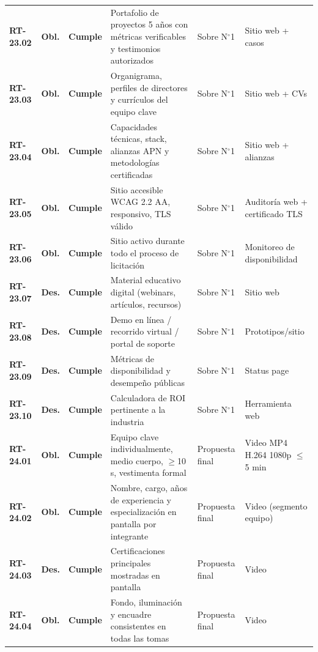 \begin{small}
\begin{longtable}{@{}p{1.35cm} p{1.15cm} p{1.15cm} p{4.6cm} p{2.35cm} p{3.8cm}@{}}
\textbf{RT-23.02} & \textbf{Obl.} & \textbf{Cumple} & Portafolio de proyectos 5 a\~nos con m\'etricas verificables y testimonios autorizados & Sobre N$^{\circ}$1 & Sitio web + casos \\
\textbf{RT-23.03} & \textbf{Obl.} & \textbf{Cumple} & Organigrama, perfiles de directores y curr\'iculos del equipo clave & Sobre N$^{\circ}$1 & Sitio web + CVs \\
\textbf{RT-23.04} & \textbf{Obl.} & \textbf{Cumple} & Capacidades t\'ecnicas, stack, alianzas APN y metodolog\'ias certificadas & Sobre N$^{\circ}$1 & Sitio web + alianzas \\
\textbf{RT-23.05} & \textbf{Obl.} & \textbf{Cumple} & Sitio accesible WCAG 2.2 AA, responsivo, TLS v\'alido & Sobre N$^{\circ}$1 & Auditor\'ia web + certificado TLS \\
\textbf{RT-23.06} & \textbf{Obl.} & \textbf{Cumple} & Sitio activo durante todo el proceso de licitaci\'on & Sobre N$^{\circ}$1 & Monitoreo de disponibilidad \\
\textbf{RT-23.07} & \textbf{Des.} & \textbf{Cumple} & Material educativo digital (webinars, art\'iculos, recursos) & Sobre N$^{\circ}$1 & Sitio web \\
\textbf{RT-23.08} & \textbf{Des.} & \textbf{Cumple} & Demo en l\'inea / recorrido virtual / portal de soporte & Sobre N$^{\circ}$1 & Prototipos/sitio \\
\textbf{RT-23.09} & \textbf{Des.} & \textbf{Cumple} & M\'etricas de disponibilidad y desempe\~no p\'ublicas & Sobre N$^{\circ}$1 & Status page \\
\textbf{RT-23.10} & \textbf{Des.} & \textbf{Cumple} & Calculadora de ROI pertinente a la industria & Sobre N$^{\circ}$1 & Herramienta web \\
\textbf{RT-24.01} & \textbf{Obl.} & \textbf{Cumple} & Equipo clave individualmente, medio cuerpo, $\geq$10 s, vestimenta formal & Propuesta final & Video MP4 H.264 1080p $\leq$5 min \\
\textbf{RT-24.02} & \textbf{Obl.} & \textbf{Cumple} & Nombre, cargo, a\~nos de experiencia y especializaci\'on en pantalla por integrante & Propuesta final & Video (segmento equipo) \\
\textbf{RT-24.03} & \textbf{Des.} & \textbf{Cumple} & Certificaciones principales mostradas en pantalla & Propuesta final & Video \\
\textbf{RT-24.04} & \textbf{Obl.} & \textbf{Cumple} & Fondo, iluminaci\'on y encuadre consistentes en todas las tomas & Propuesta final & Video \\

\end{longtable}
\end{small}

